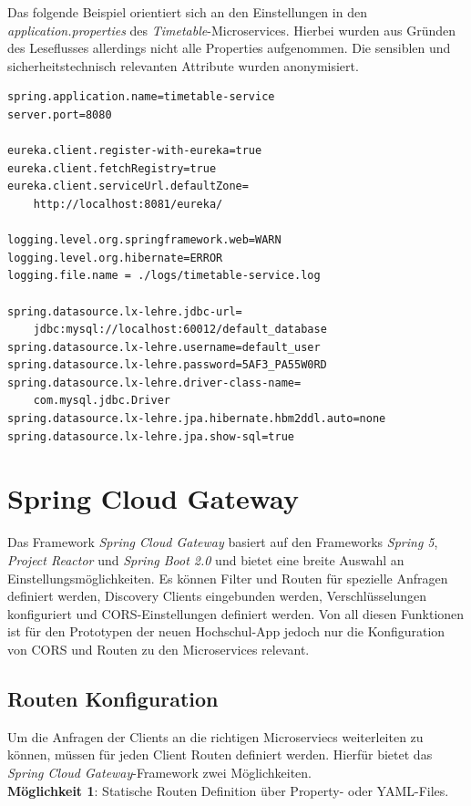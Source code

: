 Das folgende Beispiel orientiert sich an den Einstellungen in den \textit{application.properties} des \textit{Timetable}-Microservices. Hierbei wurden aus Gründen des Leseflusses allerdings nicht alle Properties aufgenommen. Die sensiblen und sicherheitstechnisch relevanten Attribute wurden anonymisiert.

\begin{lstlisting}[caption={Typische \textit{application.properties} Datei}, label={code:properties}]
spring.application.name=timetable-service
server.port=8080

eureka.client.register-with-eureka=true
eureka.client.fetchRegistry=true
eureka.client.serviceUrl.defaultZone=
	http://localhost:8081/eureka/

logging.level.org.springframework.web=WARN
logging.level.org.hibernate=ERROR
logging.file.name = ./logs/timetable-service.log

spring.datasource.lx-lehre.jdbc-url=
	jdbc:mysql://localhost:60012/default_database
spring.datasource.lx-lehre.username=default_user
spring.datasource.lx-lehre.password=5AF3_PA55W0RD
spring.datasource.lx-lehre.driver-class-name=
	com.mysql.jdbc.Driver
spring.datasource.lx-lehre.jpa.hibernate.hbm2ddl.auto=none
spring.datasource.lx-lehre.jpa.show-sql=true
\end{lstlisting}

\section{Spring Cloud Gateway}

Das Framework \textit{Spring Cloud Gateway} basiert auf den Frameworks \textit{Spring 5}, \textit{Project Reactor} und \textit{Spring Boot 2.0} und bietet eine breite Auswahl an Einstellungsmöglichkeiten. Es können Filter und Routen für spezielle Anfragen definiert werden, Discovery Clients eingebunden werden, Verschlüsselungen konfiguriert und \ac{CORS}-Einstellungen definiert werden. Von all diesen Funktionen ist für den Prototypen der neuen Hochschul-\ac{App} jedoch nur die Konfiguration von \ac{CORS} und Routen zu den Microservices relevant.

\subsection*{Routen Konfiguration}

Um die Anfragen der Clients an die richtigen Microserviecs weiterleiten zu können, müssen für jeden Client Routen definiert werden. Hierfür bietet das \textit{Spring Cloud Gateway}-Framework zwei Möglichkeiten.\\
\linebreak
\textbf{Möglichkeit 1}: Statische Routen Definition über Property- oder \ac{YAML}-Files. 

